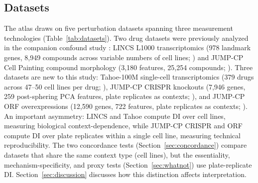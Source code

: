 \documentclass[11pt]{article}
\begin{document}
\subsection{Datasets}

The atlas draws on five perturbation datasets spanning three measurement
technologies (Table~\ref{tab:datasets}).  Two drug datasets were
previously analyzed in the companion confound study
\citep{tower2026confound}: LINCS L1000 transcriptomics (978 landmark
genes, 8{,}949 compounds across variable numbers of cell lines;
\citealp{subramanian2017next}) and JUMP-CP Cell Painting compound
morphology (3{,}180 features, 25{,}254 compounds;
\citealp{chandrasekaran2024cpjump1}).  Three datasets are new to this
study: Tahoe-100M single-cell transcriptomics (379 drugs across 47--50
cell lines per drug; \citealp{tahoe2025}), JUMP-CP CRISPR knockouts
(7{,}946 genes, 259 post-sphering PCA features, plate replicates as
contexts; \citealp{chandrasekaran2025morphmap}), and JUMP-CP ORF
overexpressions (12{,}590 genes, 722 features, plate replicates as
contexts; \citealp{chandrasekaran2025morphmap}).
An important asymmetry: LINCS and Tahoe compute DI over cell lines,
measuring biological context-dependence, while JUMP-CP CRISPR and ORF
compute DI over plate replicates within a single cell line, measuring
technical reproducibility.  The two concordance tests
(Section~\ref{sec:concordance}) compare datasets that share the same
context type (cell lines), but the essentiality, mechanism-specificity,
and proxy tests (Section~\ref{sec:whatnot}) use plate-replicate DI.
Section~\ref{sec:discussion} discusses how this distinction affects
interpretation.
\end{document}
